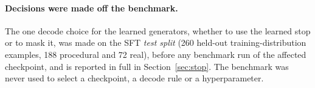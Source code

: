 \paragraph{Decisions were made off the benchmark.} The one decode choice for the learned generators, whether to use
the learned stop or to mask it, was made on the SFT \emph{test split} (260 held-out training-distribution examples,
188 procedural and 72 real), before any benchmark run of the affected checkpoint, and is reported in full in
Section~\ref{sec:stop}. The benchmark was never used to select a checkpoint, a decode rule or a hyperparameter.
